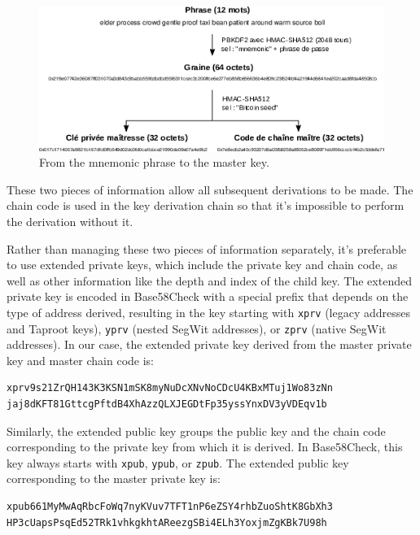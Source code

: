\documentclass[
  a5paper,
  smalldemyvopaper,10pt,twoside,onecolumn,openright,extrafontsizes,hidelinks]{memoir}
\begin{document}
\begin{figure}

{\centering \includegraphics{chapters/img/from-mnemonic-to-root.png}

}

\caption{From the mnemonic phrase to the master key.}

\end{figure}%

These two pieces of information allow all subsequent derivations to be
made. The chain code is used in the key derivation chain so that it's
impossible to perform the derivation without it.

Rather than managing these two pieces of information separately, it's
preferable to use extended private keys, which include the private key
and chain code, as well as other information like the depth and index of
the child key. The extended private key is encoded in Base58Check with a
special prefix that depends on the type of address derived, resulting in
the key starting with \texttt{xprv} (legacy addresses and Taproot keys),
\texttt{yprv} (nested SegWit addresses), or \texttt{zprv} (native SegWit
addresses). In our case, the extended private key derived from the
master private key and master chain code is:

\begin{verbatim}
xprv9s21ZrQH143K3KSN1mSK8myNuDcXNvNoCDcU4KBxMTuj1Wo83zNn
jaj8dKFT81GttcgPftdB4XhAzzQLXJEGDtFp35yssYnxDV3yVDEqv1b
\end{verbatim}

Similarly, the extended public key groups the public key and the chain
code corresponding to the private key from which it is derived. In
Base58Check, this key always starts with \texttt{xpub}, \texttt{ypub},
or \texttt{zpub}. The extended public key corresponding to the master
private key is:

\begin{verbatim}
xpub661MyMwAqRbcFoWq7nyKVuv7TFT1nP6eZSY4rhbZuoShtK8GbXh3
HP3cUapsPsqEd52TRk1vhkgkhtAReezgSBi4ELh3YoxjmZgKBk7U98h
\end{verbatim}
\end{document}
